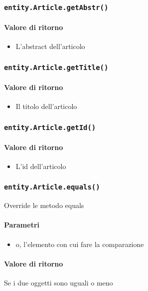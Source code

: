 \subsubsection{\texttt{entity.Article.getAbstr()}}
\paragraph{Valore di ritorno}
\begin{itemize}
\item L'abstract dell'articolo
\end{itemize}

\subsubsection{\texttt{entity.Article.getTitle()}}
\paragraph{Valore di ritorno}
\begin{itemize}
\item Il titolo dell'articolo
\end{itemize}

\subsubsection{\texttt{entity.Article.getId()}}
\paragraph{Valore di ritorno}
\begin{itemize}
\item L'id dell'articolo
\end{itemize}

\subsubsection{\texttt{entity.Article.equals()}}
Override le metodo equals
\paragraph{Parametri}
\begin{itemize}
\item o, l'elemento con cui fare la comparazione
\end{itemize}
\paragraph{Valore di ritorno}
Se i due oggetti sono uguali o meno

